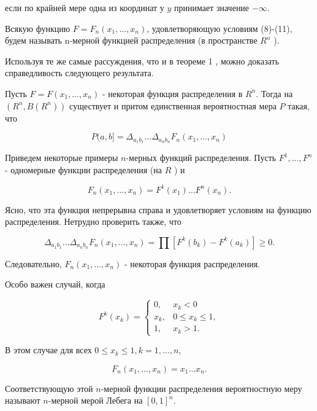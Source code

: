 если по крайней мере одна из координат у $y$ принимает значение $-\infty$.


\begin{definition}\label{def_2_par_3} Всякую функцию $F=F_{n}\left(x_{1}, \ldots, x_{n}\right)$, удовлетворяющую условиям (8)-(11), будем называть n-мерной функцией распределения (в пространстве $R^{n}$ ).
\end{definition}

Используя те же самые рассуждения, что и в теореме 1 , можно доказать справедливость следующего результата.


\begin{theorem}\label{theor_2_par_3}
Пусть $F=F\left(x_{1}, \ldots, x_{n}\right)$ - некоторая функция распределения в $R^{n}$. Тогда на $\left(R^{n}, {B}\left(R^{n}\right)\right)$ существует и притом единственная вероятностная мера ${P}$ такая, что

$$
{P}(a, b]=\Delta_{a_{1} b_{1}} \ldots \Delta_{a_{n} b_{n}} F_{n}\left(x_{1}, \ldots, x_{n}\right)
$$

Приведем некоторые примеры $n$-мерных функций распределения. Пусть $F^{1}, \ldots, F^{n}$ - одномерные функции распределения (на $R$ ) и

$$
F_{n}\left(x_{1}, \ldots, x_{n}\right)=F^{1}\left(x_{1}\right) \ldots F^{n}\left(x_{n}\right) .
$$

Ясно, что эта функция непрерывна справа и удовлетворяет условиям на функцию распределения. Нетрудно проверить также, что

$$
\Delta_{a_{1} b_{1}} \ldots \Delta_{a_{n} b_{n}} F_{n}\left(x_{1}, \ldots, x_{n}\right)=\prod\left[F^{k}\left(b_{k}\right)-F^{k}\left(a_{k}\right)\right] \geqslant 0 .
$$

Следовательно, $F_{n}\left(x_{1}, \ldots, x_{n}\right)$ - некоторая функция распределения.

Особо важен случай, когда

$$
F^{k}\left(x_{k}\right)= \begin{cases}0, & x_{k}<0 \\ x_{k}, & 0 \leqslant x_{k} \leqslant 1, \\ 1, & x_{k}>1 .\end{cases}
$$

В этом случае для всех $0 \leqslant x_{k} \leqslant 1, k=1, \ldots, n$,

$$
F_{n}\left(x_{1}, \ldots, x_{n}\right)=x_{1} \ldots x_{n} .
$$

Соответствующую этой $n$-мерной функции распределения вероятностную меру называют $n$-мерной мерой Лебега на $[0,1]^{n}$.
\end{theorem}


